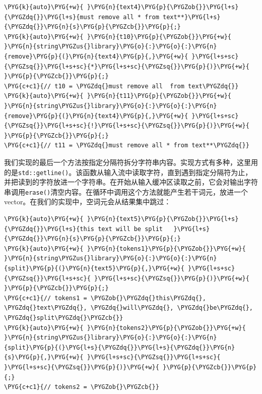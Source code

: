 
\begin{codeblockbg}
\begin{Verbatim}[commandchars=\\\{\},breaklines=true,breakanywhere=true,fontsize=\codefont,xleftmargin=17bp]
\PYG{k}{auto}\PYG{+w}{ }\PYG{n}{text4}\PYG{p}{\PYGZob{}}\PYG{l+s}{\PYGZdq{}}\PYG{l+s}{must remove all * from text**}\PYG{l+s}{\PYGZdq{}}\PYG{n}{s}\PYG{p}{\PYGZcb{}}\PYG{p}{;}
\PYG{k}{auto}\PYG{+w}{ }\PYG{n}{t10}\PYG{p}{\PYGZob{}}\PYG{+w}{ }\PYG{n}{string\PYGZus{}library}\PYG{o}{:}\PYG{o}{:}\PYG{n}{remove}\PYG{p}{(}\PYG{n}{text4}\PYG{p}{,}\PYG{+w}{ }\PYG{l+s+sc}{\PYGZsq{}}\PYG{l+s+sc}{*}\PYG{l+s+sc}{\PYGZsq{}}\PYG{p}{)}\PYG{+w}{ }\PYG{p}{\PYGZcb{}}\PYG{p}{;}
\PYG{c+c1}{// t10 = \PYGZdq{}must remove all  from text\PYGZdq{}}
\PYG{k}{auto}\PYG{+w}{ }\PYG{n}{t11}\PYG{p}{\PYGZob{}}\PYG{+w}{ }\PYG{n}{string\PYGZus{}library}\PYG{o}{:}\PYG{o}{:}\PYG{n}{remove}\PYG{p}{(}\PYG{n}{text4}\PYG{p}{,}\PYG{+w}{ }\PYG{l+s+sc}{\PYGZsq{}}\PYG{l+s+sc}{!}\PYG{l+s+sc}{\PYGZsq{}}\PYG{p}{)}\PYG{+w}{ }\PYG{p}{\PYGZcb{}}\PYG{p}{;}
\PYG{c+c1}{// t11 = \PYGZdq{}must remove all * from text**\PYGZdq{}}
\end{Verbatim}
\end{codeblockbg}


我们实现的最后一个方法按指定分隔符拆分字符串内容。实现方式有多种，这里用的是\texttt{std::\allowbreak{}getline()}。该函数从输入流中读取字符，直到遇到指定分隔符为止，并把读到的字符放进一个字符串。在开始从输入缓冲区读取之前，它会对输出字符串调用\texttt{erase()}清空内容。在循环中调用这个方法就能产生若干词元，放进一个vector。在我们的实现中，空词元会从结果集中跳过：



\begin{codeblockbg}
\begin{Verbatim}[commandchars=\\\{\},breaklines=true,breakanywhere=true,fontsize=\codefont,xleftmargin=17bp]
\PYG{k}{auto}\PYG{+w}{ }\PYG{n}{text5}\PYG{p}{\PYGZob{}}\PYG{l+s}{\PYGZdq{}}\PYG{l+s}{this text will be split   }\PYG{l+s}{\PYGZdq{}}\PYG{n}{s}\PYG{p}{\PYGZcb{}}\PYG{p}{;}
\PYG{k}{auto}\PYG{+w}{ }\PYG{n}{tokens1}\PYG{p}{\PYGZob{}}\PYG{+w}{ }\PYG{n}{string\PYGZus{}library}\PYG{o}{:}\PYG{o}{:}\PYG{n}{split}\PYG{p}{(}\PYG{n}{text5}\PYG{p}{,}\PYG{+w}{ }\PYG{l+s+sc}{\PYGZsq{}}\PYG{l+s+sc}{ }\PYG{l+s+sc}{\PYGZsq{}}\PYG{p}{)}\PYG{+w}{ }\PYG{p}{\PYGZcb{}}\PYG{p}{;}
\PYG{c+c1}{// tokens1 = \PYGZob{}\PYGZdq{}this\PYGZdq{}, \PYGZdq{}text\PYGZdq{}, \PYGZdq{}will\PYGZdq{}, \PYGZdq{}be\PYGZdq{}, \PYGZdq{}split\PYGZdq{}\PYGZcb{}}
\PYG{k}{auto}\PYG{+w}{ }\PYG{n}{tokens2}\PYG{p}{\PYGZob{}}\PYG{+w}{ }\PYG{n}{string\PYGZus{}library}\PYG{o}{:}\PYG{o}{:}\PYG{n}{split}\PYG{p}{(}\PYG{l+s}{\PYGZdq{}}\PYG{l+s}{\PYGZdq{}}\PYG{n}{s}\PYG{p}{,}\PYG{+w}{ }\PYG{l+s+sc}{\PYGZsq{}}\PYG{l+s+sc}{ }\PYG{l+s+sc}{\PYGZsq{}}\PYG{p}{)}\PYG{+w}{ }\PYG{p}{\PYGZcb{}}\PYG{p}{;}
\PYG{c+c1}{// tokens2 = \PYGZob{}\PYGZcb{}}
\end{Verbatim}
\end{codeblockbg}


